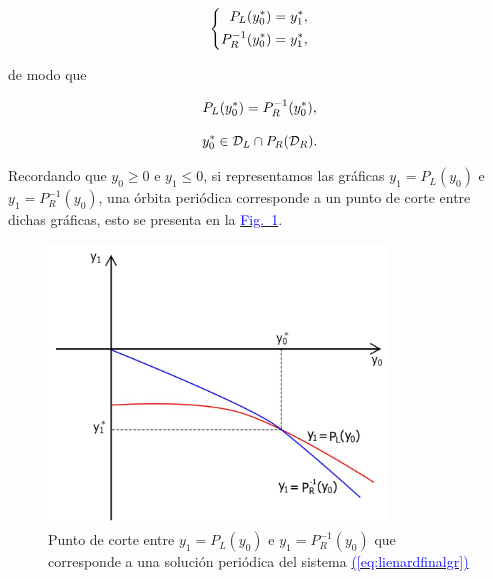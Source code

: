 \documentclass[12pt,a4paper]{report} %
\newcommand{\fref}[1]{\hyperref[#1]{\textcolor{blue}{Fig.~\ref*{#1}}}}
\newcommand{\eref}[1]{\hyperref[#1]{\textcolor{blue}{(\ref*{#1})}}}
\begin{document}
	\begin{equation*}
		\label{eq:ej2}
		\scalebox{1}{$\displaystyle
			\left\{
			\begin{aligned}
				P_L(y_0^*)=y_1^*, \\
				P_R^{-1}(y_0^*)=y_1^*,
			\end{aligned}
			\right. 
			$}
	\end{equation*}\smallskip
	
	\noindent de modo que
	
	\begin{equation*}
		\scalebox{1}{$\displaystyle
		P_L(y_0^*)=P_R^{-1}(y_0^*),
		$}
	\end{equation*}
	
	\begin{equation*}
		\scalebox{1}{$\displaystyle
		y_0^* \in \mathcal{D}_L \cap P_R(\mathcal{D}_R).
		$}
	\end{equation*}
	
	\vspace{0.5cm}\noindent Recordando que $y_0\geq0$ e $y_1\leq0$, si representamos las gráficas $y_1=P_L(y_0)$ e $y_1=P_R^{-1}(y_0)$, una órbita periódica corresponde a un punto de corte entre dichas gráficas, esto se presenta en la \fref{fig:graficaejemplo}.
	
	\begin{figure}[h]
		\centering
		\includegraphics[width=0.8\textwidth]{graficaejemplo.jpg}
		\caption{Punto de corte entre $y_1=P_L(y_0)$ e $y_1=P_R^{-1}(y_0)$ que corresponde a una solución periódica del sistema \eref{eq:lienardfinalgr}}
		\label{fig:graficaejemplo}
	\end{figure}\smallskip
	
	\newpage
	
\end{document}

